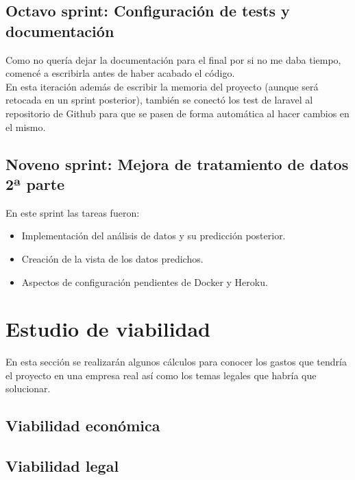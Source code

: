\subsection{Octavo sprint: Configuración de tests y documentación}
Como no quería dejar la documentación para el final por si no me daba tiempo, comencé a escribirla antes de haber acabado el código.\\
En esta iteración además de escribir la memoria del proyecto (aunque será retocada en un sprint posterior), también se conectó los test de laravel al repositorio de Github para que se pasen de forma automática al hacer cambios en el mismo.\\
\subsection{Noveno sprint: Mejora de tratamiento de datos 2ª parte}
En este sprint las tareas fueron:
\begin{itemize}
    \item Implementación del análisis de datos y su predicción posterior.
    \item Creación de la vista de los datos predichos.
    \item Aspectos de configuración pendientes de Docker y Heroku.
\end{itemize}
\section{Estudio de viabilidad}
En esta sección se realizarán algunos cálculos para conocer los gastos que tendría el proyecto en una empresa real así como los temas legales que habría que solucionar.
\subsection{Viabilidad económica}

\subsection{Viabilidad legal}


